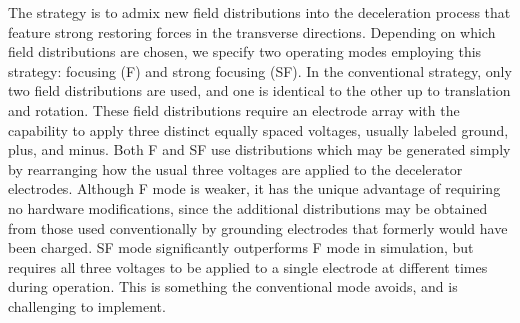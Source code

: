 \documentclass[%
 reprint,
 amsmath,amssymb,
 aps,
prl,
]{revtex4-1}
\begin{document}
The strategy is to admix new field distributions into the deceleration process that feature strong restoring forces in the transverse directions.
Depending on which field distributions are chosen, we specify two operating modes employing this strategy: focusing (F) and strong focusing (SF).
In the conventional strategy, only two field distributions are used, and one is identical to the other up to translation and rotation.
These field distributions require an electrode array with the capability to apply three distinct equally spaced voltages, usually labeled ground, plus, and minus.
Both F and SF use distributions which may be generated simply by rearranging how the usual three voltages are applied to the decelerator electrodes.
Although F mode is weaker, it has the unique advantage of requiring no hardware modifications, since the additional distributions may be obtained from those used conventionally by grounding electrodes that formerly would have been charged.
SF mode significantly outperforms F mode in simulation, but requires all three voltages to be applied to a single electrode at different times during operation.
This is something the conventional mode avoids, and is challenging to implement.
\end{document}
